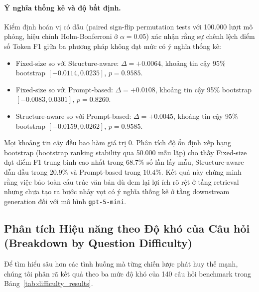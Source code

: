 \paragraph{Ý nghĩa thống kê và độ bất định.}
Kiểm định hoán vị có dấu (paired sign-flip permutation tests với 100.000 lượt mô phỏng, hiệu chỉnh Holm-Bonferroni ở $\alpha = 0.05$) xác nhận rằng sự chênh lệch điểm số Token F1 giữa ba phương pháp không đạt mức có ý nghĩa thống kê:
\begin{itemize}
    \item Fixed-size so với Structure-aware: $\Delta = +0.0064$, khoảng tin cậy 95\% bootstrap $[-0.0114, 0.0235]$, $p = 0.9585$.
    \item Fixed-size so với Prompt-based: $\Delta = +0.0108$, khoảng tin cậy 95\% bootstrap $[-0.0083, 0.0301]$, $p = 0.8260$.
    \item Structure-aware so với Prompt-based: $\Delta = +0.0045$, khoảng tin cậy 95\% bootstrap $[-0.0159, 0.0262]$, $p = 0.9585$.
\end{itemize}
Mọi khoảng tin cậy đều bao hàm giá trị 0. Phân tích độ ổn định xếp hạng bootstrap (bootstrap ranking stability qua 50.000 mẫu lặp) cho thấy Fixed-size đạt điểm F1 trung bình cao nhất trong $68.7\%$ số lần lấy mẫu, Structure-aware dẫn đầu trong $20.9\%$ và Prompt-based trong $10.4\%$. Kết quả này chứng minh rằng việc bảo toàn cấu trúc văn bản dù đem lại lợi ích rõ rệt ở tầng retrieval nhưng chưa tạo ra bước nhảy vọt có ý nghĩa thống kê ở tầng downstream generation đối với mô hình \texttt{gpt-5-mini}.

\subsection{Phân tích Hiệu năng theo Độ khó của Câu hỏi (Breakdown by Question Difficulty)}
\label{subsec:difficulty_breakdown}

Để tìm hiểu sâu hơn các tình huống mà từng chiến lược phát huy thế mạnh, chúng tôi phân rã kết quả theo ba mức độ khó của 140 câu hỏi benchmark trong Bảng~\ref{tab:difficulty_results}.

\begin{table}[t]
\centering
\small
{}
\caption{Hiệu năng Token F1 phân tầng theo question difficulty.}
\label{tab:difficulty_results}
\end{table}

